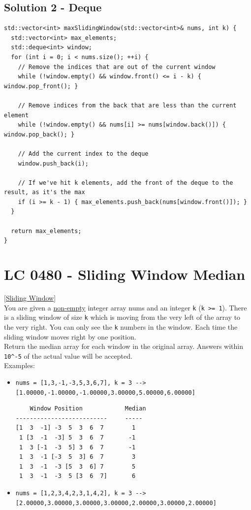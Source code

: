 \subsection*{Solution 2 - Deque}
\begin{lstlisting}
std::vector<int> maxSlidingWindow(std::vector<int>& nums, int k) {
  std::vector<int> max_elements;
  std::deque<int> window;
  for (int i = 0; i < nums.size(); ++i) {
    // Remove the indices that are out of the current window
    while (!window.empty() && window.front() <= i - k) { window.pop_front(); }

    // Remove indices from the back that are less than the current element
    while (!window.empty() && nums[i] >= nums[window.back()]) { window.pop_back(); }

    // Add the current index to the deque
    window.push_back(i);

    // If we've hit k elements, add the front of the deque to the result, as it's the max
    if (i >= k - 1) { max_elements.push_back(nums[window.front()]); }
  }

  return max_elements;
}
\end{lstlisting}

\section{LC 0480 - Sliding Window Median}\label{lc0480}
{\hyperref[sec:sliding_window]{[Sliding Window]}}\\

You are given a \ul{non-empty} integer array nums and an integer {\colorbox{CodeBackground}{\lstinline|k|}} ({\colorbox{CodeBackground}{\lstinline|k >= 1|}}). There is a sliding window of size {\colorbox{CodeBackground}{\lstinline|k|}} which is moving from the very left of the array to the very right. You can only see the {\colorbox{CodeBackground}{\lstinline|k|}} numbers in the window. Each time the sliding window moves right by one position.\\

Return the median array for each window in the original array. Answers within {\colorbox{CodeBackground}{\lstinline|10^-5|}} of the actual value will be accepted.\\

Examples:
\begin{itemize}
\item {\colorbox{CodeBackground}{\lstinline|nums = [1,3,-1,-3,5,3,6,7], k = 3 --> [1.00000,-1.00000,-1.00000,3.00000,5.00000,6.00000]|}}
\begin{lstlisting}
    Window Position            Median
--------------------------     -----
[1  3  -1] -3  5  3  6  7        1
 1 [3  -1  -3] 5  3  6  7       -1
 1  3 [-1  -3  5] 3  6  7       -1
 1  3  -1 [-3  5  3] 6  7        3
 1  3  -1  -3 [5  3  6] 7        5
 1  3  -1  -3  5 [3  6  7]       6
\end{lstlisting}
\item {\colorbox{CodeBackground}{\lstinline|nums = [1,2,3,4,2,3,1,4,2], k = 3 --> [2.00000,3.00000,3.00000,3.00000,2.00000,3.00000,2.00000]|}}
\end{itemize}

